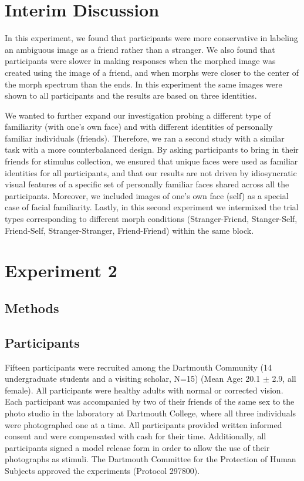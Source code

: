 \documentclass[10pt,letterpaper]{article}
\begin{document}
\section*{Interim Discussion}
In this experiment, we found that participants were more conservative in labeling an ambiguous image as a friend rather than a stranger. We also found that participants were slower in making responses when the morphed image was created using the image of a friend, and when morphs were closer to the center of the morph spectrum than the ends.  In this experiment the same images were shown to all participants and the results are based on three identities.  

We wanted to further expand our investigation probing a different type of familiarity (with one’s own face) and with different identities of personally familiar individuals (friends). Therefore, we ran a second study with a similar task with a more counterbalanced design. By asking participants to bring in their friends for stimulus collection, we ensured that unique faces were used as familiar identities for all participants, and that our results are not driven by idiosyncratic  visual features of a specific set of personally familiar faces shared across all the participants. Moreover, we included images of one’s own face (self) as a special case of facial familiarity. Lastly, in this second experiment we intermixed the trial types corresponding to different morph conditions (Stranger-Friend, Stanger-Self, Friend-Self, Stranger-Stranger, Friend-Friend) within the same block.

\FloatBarrier
\section*{Experiment 2}

\subsection*{Methods}

\bigskip

\subsection*{Participants}
Fifteen participants were recruited among the Dartmouth Community (14 undergraduate students and a visiting scholar, N=15) (Mean Age: 20.1 $\pm$ 2.9, all female). All participants were healthy adults with normal or corrected vision. Each participant was accompanied by two of their friends of the same sex to the photo studio in the laboratory at Dartmouth College, where all three individuals were photographed one at a time. All participants provided written informed consent and were compensated with cash for their time. Additionally, all participants signed a model release form in order to allow the use of their photographs as stimuli. The Dartmouth Committee for the Protection of Human Subjects approved the experiments (Protocol 297800).
\end{document}
